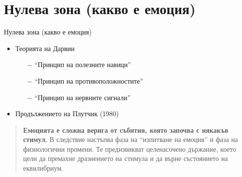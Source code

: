 \documentclass[9pt]{beamer}
\begin{document}
    \section{Нулева зона (какво е емоция)}
    \begin{frame}{Нулева зона (какво е емоция)}
        \begin{itemize}
            \setlength\itemsep{\fill}
            \item Теорията на Дарвин
            \begin{itemize}
                \pause
                \item[$-$] ``Принцип на полезните навици''
                \pause
                \item[$-$] ``Принцип на противоположностите''
                \pause
                \item[$-$] ``Принцип на нервните сигнали''
            \end{itemize}
            \pause
            \item Продължението на Плутчик (1980)
        \end{itemize}
        \pause
        \begin{quote}
            \textbf{Емоцията е сложна верига от събития, която започва с някакъв стимул.} В следствие настъпва фаза на ``изпитване на емоция'' и фаза на физиологични промени. Те предизвикват целенасочено държание, което цели да премахне дразнението на стимула и да върне състоянието на еквилибриум.
        \end{quote}
    \end{frame}
\end{document}
